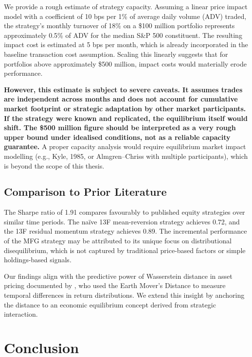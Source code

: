We provide a rough estimate of strategy capacity. Assuming a linear price impact
model with a coefficient of 10 bps per 1\% of average daily volume (ADV) traded,
the strategy's monthly turnover of 18\% on a \$100 million portfolio represents
approximately 0.5\% of ADV for the median S\&P 500 constituent. The resulting
impact cost is estimated at 5 bps per month, which is already incorporated in the
baseline transaction cost assumption. Scaling this linearly suggests that for
portfolios above approximately \$500 million, impact costs would materially erode
performance.

\textbf{However, this estimate is subject to severe caveats. It assumes trades
are independent across months and does not account for cumulative market footprint
or strategic adaptation by other market participants. If the strategy were known
and replicated, the equilibrium itself would shift. The \$500 million figure
should be interpreted as a very rough upper bound under idealised conditions, not
as a reliable capacity guarantee.} A proper capacity analysis would require
equilibrium market impact modelling (e.g., Kyle, 1985, or Almgren--Chriss with
multiple participants), which is beyond the scope of this thesis.

\subsection{Comparison to Prior Literature}

The Sharpe ratio of 1.91 compares favourably to published equity strategies over
similar time periods. The na\"ive 13F mean-reversion strategy achieves 0.72, and
the 13F residual momentum strategy achieves 0.89. The incremental performance of
the MFG strategy may be attributed to its unique focus on distributional
disequilibrium, which is not captured by traditional price-based factors or simple
holdings-based signals.

Our findings align with the predictive power of Wasserstein distance in asset
pricing documented by \citep{kimkorajczykneuhierl2015}, who used the Earth
Mover's Distance to measure temporal differences in return distributions. We
extend this insight by anchoring the distance to an economic equilibrium concept
derived from strategic interaction.


\section{Conclusion}
\label{sec:emp-conclusion}

